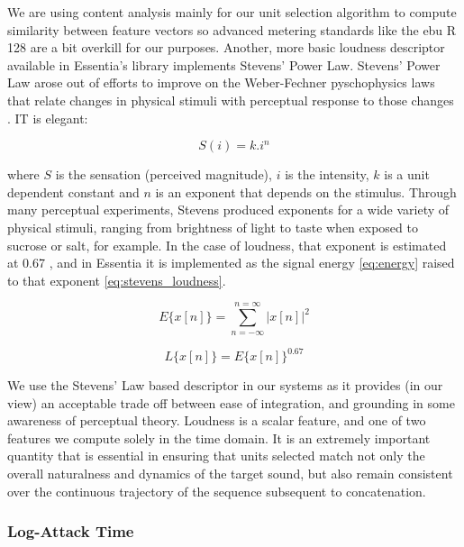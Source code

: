{{We are using content analysis mainly for our unit selection algorithm to compute similarity between feature vectors so advanced metering standards like the \acrshort{ebu} R 128 are a bit overkill for our purposes. Another, more basic loudness descriptor available in Essentia's library implements Stevens' Power Law. Stevens' Power Law arose out of efforts to improve on the Weber-Fechner pyschophysics laws that relate changes in physical stimuli with perceptual response to those changes \citep{Stevens1975, Reiss2001}. IT is elegant:

\begin{equation}
\label{eq:stevens}
S(i)=k.i^{n}
\end{equation}

where $S$ is the sensation (perceived magnitude), $i$ is the intensity, $k$ is a unit dependent constant and $n$ is an exponent that depends on the stimulus. Through many perceptual experiments, Stevens produced exponents for a wide variety of physical stimuli, ranging from brightness of light to taste when exposed to sucrose or salt, for example. In the case of loudness, that exponent is estimated at 0.67 \citep{Stevens1975}, and in Essentia it is implemented as the signal energy \eqref{eq:energy} raised to that exponent \eqref{eq:stevens_loudness}.

\begin{equation}
\label{eq:energy}
E\{x[n]\}= \sum_{n=-\infty}^{n=\infty}|x[n]|^{2}
\end{equation}

\begin{equation}
\label{eq:stevens_loudness}
L\{x[n]\}= E\{x[n]\}^{0.67}
\end{equation}

We use the Stevens' Law based descriptor in our systems as it provides (in our view) an acceptable trade off between ease of integration, and grounding in some awareness of perceptual theory. Loudness is a scalar feature, and one of two features we compute solely in the time domain. It is an extremely important quantity that is essential in ensuring that units selected match not only the overall naturalness and dynamics of the target sound, but also remain consistent over the continuous trajectory of the sequence subsequent to concatenation. 

\subsubsection{Log-Attack Time}

}}
